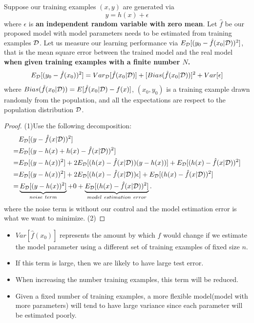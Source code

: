 \begin{refsection}
\begin{lemma}\cite[34]{james2013introduction}
Suppose our training examples $(x,y)$ are generated via
$$y = h(x) + \epsilon$$
where $\epsilon$ is \textbf{an independent random variable with zero mean}. Let $\hat{f}$ be our proposed model with model parameters needs to be estimated from training examples $\mathcal{D}$. Let us measure our learning performance via $E_{\mathcal{D}}[(y_0 - \hat{f}(x_0|\mathcal{D}))^2]$, that is the mean square error between the trained model and the real model \textbf{when given training examples with a finite number $N$.}
$$E_{\mathcal{D}}[(y_0 - \hat{f}(x_0))^2] = Var_{\mathcal{D}}[\hat{f}(x_0|\mathcal{D})] + [Bias(\hat{f}(x_0|\mathcal{D}))]^2 + Var[\epsilon]$$
where
$Bias(\hat{f}(x_0|\mathcal{D})) = E[\hat{f}(x_0|\mathcal{D}) - f(x)]$, $(x_0,y_0)$ is a training example drawn randomly from the population, and all the expectations are respect to the population distribution $\mathcal{D}$.
\end{lemma}
\begin{proof}
(1)Use the following decomposition:
\begin{align*}
 &E_{\mathcal{D}}[(y - \hat{f}(x|\mathcal{D}))^2] \\
=&E_{\mathcal{D}}[(y - h(x) + h(x) - \hat{f}(x|\mathcal{D}))^2] \\
=&E_{\mathcal{D}}[(y - h(x))^2] + 2E_{\mathcal{D}}[(h(x) - \hat{f}(x|\mathcal{D}))(y - h(x))] + E_{\mathcal{D}}[(h(x) - \hat{f}(x|\mathcal{D}))^2] \\
=&E_{\mathcal{D}}[(y - h(x))^2] + 2E_{\mathcal{D}}[(h(x) - \hat{f}(x|\mathcal{D}))\epsilon] + E_{\mathcal{D}}[(h(x) - \hat{f}(x|\mathcal{D}))^2] \\
=&\underbrace{E_{\mathcal{D}}[(y - h(x))^2]}_{noise~term}+ 0 + \underbrace{E_{\mathcal{D}}[(h(x) - \hat{f}(x|\mathcal{D}))^2]}_{model~estimation~error}. 
\end{align*}
where the noise term is without our control and the model estimation error is what we want to minimize.
(2)

\end{proof}



\begin{remark}\hfill
\begin{itemize}
	\item $Var[\hat{f}(x_0)]$ represents the amount by which $\hat{f}$ would change if we estimate the model parameter using a different set of training examples of fixed size $n$. 
	\item If this term is large, then we are likely to have large test error.
	\item When increasing the number training examples, this term will be reduced. 
	\item Given a fixed number of training examples, a more flexible model(model with more parameters) will tend to have large variance since each parameter will be estimated poorly.
\end{itemize}
\end{remark}


\end{refsection}
